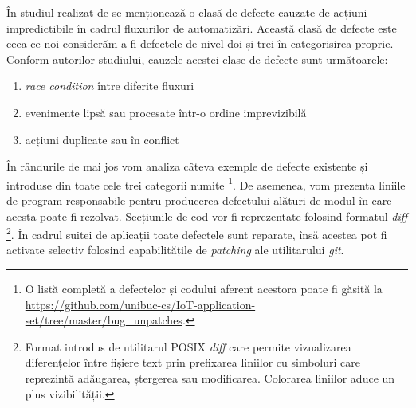 În studiul realizat de \citet{Zhou2021} se menționează o clasă de defecte cauzate de acțiuni impredictibile în cadrul fluxurilor de automatizări. Această clasă de defecte este ceea ce noi considerăm a fi defectele de nivel doi și trei în categorisirea proprie. Conform autorilor studiului, cauzele acestei clase de defecte sunt următoarele:

\begin{enumerate}
    \item \textit{race condition} între diferite fluxuri
    \item evenimente lipsă sau procesate într-o ordine imprevizibilă
    \item acțiuni duplicate sau în conflict
\end{enumerate}


În rândurile de mai jos vom analiza câteva exemple de defecte existente și introduse din toate cele trei categorii numite \footnote{O listă completă a defectelor și codului aferent acestora poate fi găsită la \url{https://github.com/unibuc-cs/IoT-application-set/tree/master/bug_unpatches}.}. De asemenea, vom prezenta liniile de program responsabile pentru producerea defectului alături de modul în care acesta poate fi rezolvat. Secțiunile de cod vor fi reprezentate folosind formatul \textit{diff} \footnote{Format introdus de utilitarul POSIX \textit{diff} care permite vizualizarea diferențelor între fișiere text prin prefixarea liniilor cu simboluri care reprezintă adăugarea, ștergerea sau modificarea. Colorarea liniilor aduce un plus vizibilității.}. În cadrul suitei de aplicații toate defectele sunt reparate, însă acestea pot fi activate selectiv folosind capabilitățile de \textit{patching} ale utilitarului \textit{git}.

